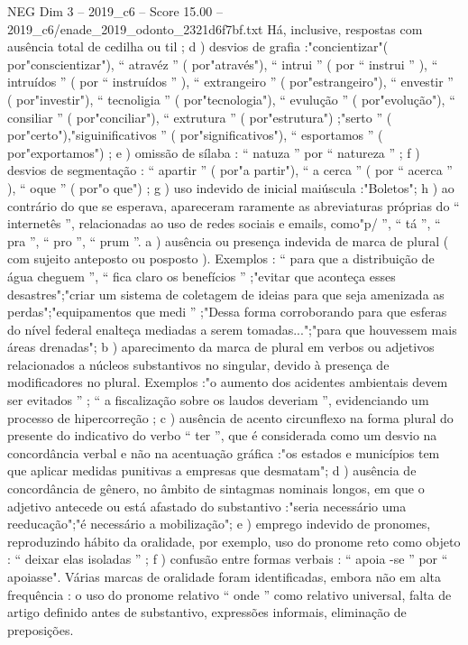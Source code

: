\begin{textsample}{NEG Dim 3 – 2019\_c6 – Score 15.00 – 2019\_c6/enade\_2019\_odonto\_2321d6f7bf.txt}
Há, inclusive, respostas com ausência total de cedilha ou til ; d ) desvios de grafia :"concientizar"( por"conscientizar"), “ atravéz ” ( por"através"), “ intrui ” ( por “ instrui ” ), “ intruídos ” ( por “ instruídos ” ), “ extrangeiro ” ( por"estrangeiro"), “ envestir ” ( por"investir"), “ tecnoligia ” ( por"tecnologia"), “ evulução ” ( por"evolução"), “ consiliar ” ( por"conciliar"), “ extrutura ” ( por"estrutura") ;"serto ” ( por"certo"),"siguinificativos ” ( por"significativos"), “ esportamos ” ( por"exportamos") ; e ) omissão de sílaba : “ natuza ” por “ natureza ” ; f ) desvios de segmentação : “ apartir ” ( por"a partir"), “ a cerca ” ( por “ acerca ” ), “ oque ” ( por"o que") ; g ) uso indevido de inicial maiúscula :"Boletos"; h ) ao contrário do que se esperava, apareceram raramente as abreviaturas próprias do “ internetês ”, relacionadas ao uso de redes sociais e emails, como"p/ ”, “ tá ”, “ pra ”, “ pro ”, “ prum ”. a ) ausência ou presença indevida de marca de plural ( com sujeito anteposto ou posposto ).
Exemplos : “ para que a distribuição de água cheguem ”, “ fica claro os benefícios ” ;"evitar que aconteça esses desastres";"criar um sistema de coletagem de ideias para que seja amenizada as perdas";"equipamentos que medi ” ;"Dessa forma corroborando para que esferas do nível federal enalteça mediadas a serem tomadas...";"para que houvessem mais áreas drenadas"; b ) aparecimento da marca de plural em verbos ou adjetivos relacionados a núcleos substantivos no singular, devido à presença de modificadores no plural.
Exemplos :"o aumento dos acidentes ambientais devem ser evitados ” ; “ a fiscalização sobre os laudos deveriam ”, evidenciando um processo de hipercorreção ; c ) ausência de acento circunflexo na forma plural do presente do indicativo do verbo “ ter ”, que é considerada como um desvio na concordância verbal e não na acentuação gráfica :"os estados e municípios tem que aplicar medidas punitivas a empresas que desmatam"; d ) ausência de concordância de gênero, no âmbito de sintagmas nominais longos, em que o adjetivo antecede ou está afastado do substantivo :"seria necessário uma reeducação";"é necessário a mobilização"; e ) emprego indevido de pronomes, reproduzindo hábito da oralidade, por exemplo, uso do pronome reto como objeto : “ deixar elas isoladas ” ; f ) confusão entre formas verbais : “ apoia -se ” por “ apoiasse".
Várias marcas de oralidade foram identificadas, embora não em alta frequência : o uso do pronome relativo “ onde ” como relativo universal, falta de artigo definido antes de substantivo, expressões informais, eliminação de preposições.

\end{textsample}
